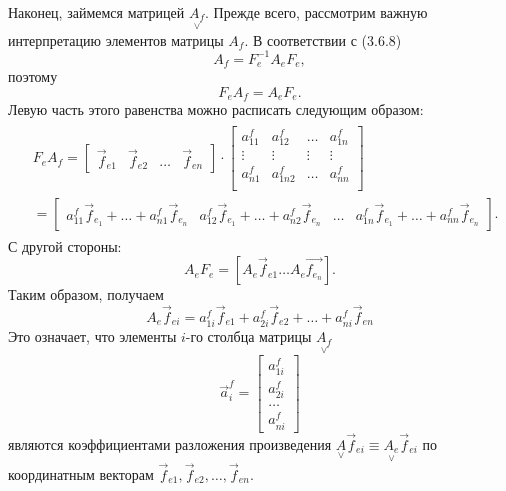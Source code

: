 Наконец, займемся  матрицей $\underset{\lor}{A_f}$. Прежде всего, рассмотрим важную интерпретацию элементов матрицы $A_f$. В соответствии с (3.6.8)
\begin{equation*}
	A_f=F_e^{-1}A_eF_e,
\end{equation*}
поэтому
\begin{equation}
	F_eA_f=A_eF_e.
\end{equation}
Левую часть этого равенства можно расписать следующим образом:
\begin{gather*}
\begin{split}
	&F_eA_f=\begin{bmatrix}
	\vec{f}_{e1} & \vec{f}_{e2} & \dots & \vec{f}_{en}
	\end{bmatrix}\cdot
	\begin{bmatrix}
		a^f_{11} & a^f_{12} & \dots & a^f_{1n}\\
		\vdots & \vdots & \vdots & \vdots\\
		a^f_{n1} & a^f_{1n2} & \dots & a^f_{nn}\\
	\end{bmatrix}\\
	&=\begin{bmatrix}
		a^f_{11}\vec{f}_{e_1}+\dots+a^f_{n1}\vec{f}_{e_n} & a^f_{12}\vec{f}_{e_1}+\dots+a^f_{n2}\vec{f}_{e_n} & \dots & a^f_{1n}\vec{f}_{e_1}+\dots+a^f_{nn}\vec{f}_{e_n}
	\end{bmatrix}.
\end{split}
\end{gather*}
С другой стороны:
\begin{equation*}
	A_eF_e=[A_e\vec{f}_{e1}\dots A_e\vec{f_{e_n}}].
\end{equation*}
Таким образом, получаем
\begin{equation}
	A_e\vec{f}_{ei}=a^f_{1i}\vec{f}_{e1}+a^f_{2i}\vec{f}_{e2}+\dots+a^f_{ni}\vec{f}_{en}
\end{equation}
Это означает, что элементы $i$-го столбца матрицы $\underset{\lor}{A_f}$
\begin{equation*}
	\vec{a}_i^f=\begin{bmatrix}
	a^f_{1i}\\a^f_{2i}\\\dots\\a^f_{ni}
	\end{bmatrix}
\end{equation*}
являются коэффициентами разложения произведения $\underset{\lor}{A}\vec{f}_{ei}\equiv\underset{\lor}{A_e}\vec{f}_{ei}$ по координатным векторам $\vec{f}_{e1},\vec{f}_{e2},\dots,\vec{f}_{en}$.
